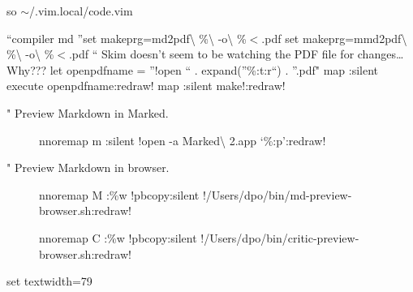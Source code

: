 so \ensuremath{\sim}\slash .vim.local\slash code.vim

``compiler md
''set makeprg=md2pdf\textbackslash{} \%\textbackslash{} -o\textbackslash{} \%$<$.pdf
set makeprg=mmd2pdf\textbackslash{} \%\textbackslash{} -o\textbackslash{} \%$<$.pdf
`` Skim doesn't seem to be watching the PDF file for changes{\ldots} Why???
let openpdfname = ''!open `` . expand(''\%:t:r``) . ''.pdf"
map  :silent execute openpdfname:redraw!
map  :silent make!:redraw!

\begin{description}

\item[" Preview Markdown in Marked.]

nnoremap m :silent !open -a Marked\textbackslash{} 2.app `\%:p':redraw!

\item[" Preview Markdown in browser.]

nnoremap M :\%w !pbcopy:silent !\slash Users\slash dpo\slash bin\slash md-preview-browser.sh:redraw!

nnoremap C :\%w !pbcopy:silent !\slash Users\slash dpo\slash bin\slash critic-preview-browser.sh:redraw!
\end{description}

set textwidth=79
